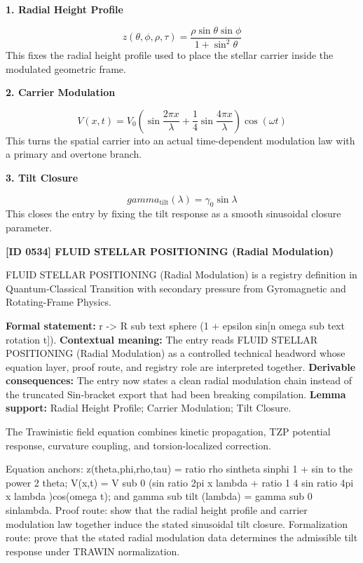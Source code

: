 \noindent\textbf{1. Radial Height Profile}\par
\[
z(\theta,\phi,\rho,\tau) = \frac{\rho \sin\theta \sin\phi}{1 + \sin^{2}\theta}
\]
\noindent This fixes the radial height profile used to place the stellar carrier inside the modulated geometric frame.\par
\noindent\textbf{2. Carrier Modulation}\par
\[
V(x,t) = V_{0}\!\left(\sin\!\frac{2\pi x}{\lambda} + \frac{1}{4}\sin\!\frac{4\pi x}{\lambda}\right)\cos(\omega t)
\]
\noindent This turns the spatial carrier into an actual time-dependent modulation law with a primary and overtone branch.\par
\noindent\textbf{3. Tilt Closure}\par
\[
gamma_{\mathrm{tilt}}(\lambda) = \gamma_{0}\sin\lambda
\]
\noindent This closes the entry by fixing the tilt response as a smooth sinusoidal closure parameter.\par

\clearpage
\noindent\textbf{[ID 0534] FLUID STELLAR POSITIONING (Radial Modulation)}\par
\vspace{0.35em}
\begingroup\small
{}
FLUID STELLAR POSITIONING (Radial Modulation) is a registry definition in Quantum-Classical Transition with secondary pressure from Gyromagnetic and Rotating-Frame Physics.

\begingroup\footnotesize\setlength{\emergencystretch}{3em}\sloppy
\textbf{Formal statement:} r -> R sub text sphere (1 + epsilon sin[n omega sub text rotation t]). \textbf{Contextual meaning:} The entry reads FLUID STELLAR POSITIONING (Radial Modulation) as a controlled technical headword whose equation layer, proof route, and registry role are interpreted together. \textbf{Derivable consequences:} The entry now states a clean radial modulation chain instead of the truncated Sin-bracket export that had been breaking compilation. \textbf{Lemma support:} Radial Height Profile; Carrier Modulation; Tilt Closure.\par
\endgroup

The Trawinistic field equation combines kinetic propagation, TZP potential response, curvature coupling, and torsion-localized correction.

Equation anchors: z(theta,phi,rho,tau) = ratio rho sintheta sinphi 1 + sin to the power 2 theta; V(x,t) = V sub 0 (sin ratio 2pi x lambda + ratio 1 4 sin ratio 4pi x lambda )cos(omega t); and gamma sub tilt (lambda) = gamma sub 0 sinlambda. Proof route: show that the radial height profile and carrier modulation law together induce the stated sinusoidal tilt closure. Formalization route: prove that the stated radial modulation data determines the admissible tilt response under TRAWIN normalization.

